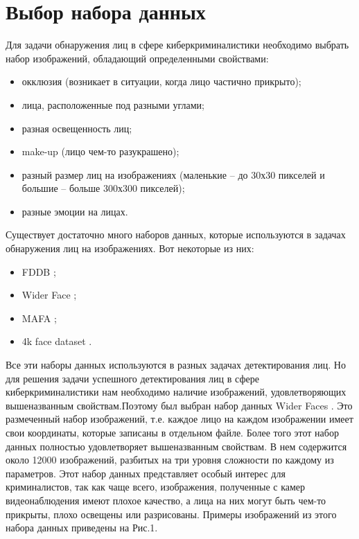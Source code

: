 \documentclass[14pt]{matmex-diploma-custom}
\begin{document}
\section{Выбор набора данных}    
    Для задачи обнаружения лиц в сфере киберкриминалистики необходимо выбрать набор изображений, обладающий определенными свойствами:
    \begin{itemize}
        \item окклюзия (возникает в ситуации, когда лицо частично прикрыто);
        \item лица, расположенные под разными углами;
        \item разная освещенность лиц;
        \item make-up (лицо чем-то разукрашено);
        \item разный размер лиц на изображениях (маленькие -- до 30х30 пикселей и большие -- больше 300х300 пикселей);
        \item разные эмоции на лицах. 
    \end{itemize}
    Существует достаточно много наборов данных, которые используются в задачах обнаружения лиц на изображениях. Вот некоторые из них:
    \begin{itemize}
        \item FDDB \cite{fddb};
        \item Wider Face \cite{dataset:WiderFaces};
        \item MAFA \cite{mafa};
        \item 4k face dataset \cite{4k}.
    \end{itemize}
    Все эти наборы данных используются в разных задачах детектирования лиц. Но для решения задачи успешного детектирования лиц в сфере киберкриминалистики нам необходимо наличие изображений, удовлетворяющих вышеназванным свойствам.Поэтому был выбран набор данных Wider Faces \cite{dataset:WiderFaces}. Это размеченный набор изображений, т.е. каждое лицо на каждом изображении имеет свои координаты, которые записаны в отдельном файле. Более того этот набор данных полностью удовлетворяет вышеназванным свойствам. В нем содержится около 12000 изображений, разбитых на три уровня сложности по каждому из параметров. Этот набор данных представляет особый интерес для криминалистов, так как чаще всего, изображения, полученные с камер видеонаблюдения имеют плохое качество, а лица на них могут быть чем-то прикрыты, плохо освещены или разрисованы.  
    Примеры изображений из этого набора данных приведены на Рис.1.
    
\end{document}
